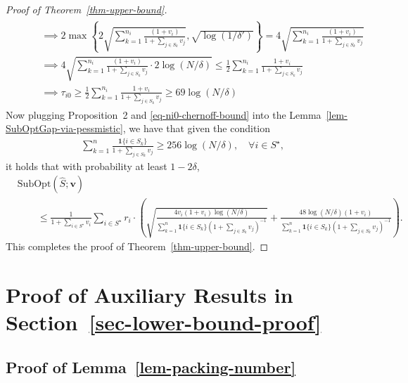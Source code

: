 \documentclass[10pt, letterpaper]{article}
\begin{document}
\begin{proof}[Proof of Theorem~\ref{thm-upper-bound}]
\begin{align}
\begin{aligned}
    &\qquad \implies 2 \max\left\{2\sqrt{\sum_{k = 1}^{n_i}\frac{(1+v_i)}{1+\sum_{j\in S_k} v_j}} ,\sqrt{\log(1/\delta')}\right\} = 4\sqrt{\sum_{k = 1}^{n_i}\frac{(1+v_i)}{1+\sum_{j\in S_k} v_j}}\\
    &\qquad\implies 4\sqrt{\sum_{k = 1}^{n_i}\frac{(1+v_i)}{1+\sum_{j\in S_k} v_j} \cdot 2\log (N/\delta)}\leq \frac{1}{2} \sum_{k = 1}^{n_i} \frac{1+v_i}{1+\sum_{j\in S_k} v_j} \\
    &\qquad\implies \tau_{i0} \geq \frac{1}{2}\sum_{k = 1}^{n_i} \frac{1+v_i}{1+\sum_{j\in S_k} v_j} \geq 69 \log(N/\delta)
    \end{aligned}
\end{align}
Now plugging Proposition~2 and \eqref{eq-ni0-chernoff-bound} into the Lemma~\ref{lem-SubOptGap-via-pessmistic}, we have that given the condition \begin{align*}
\sum_{k =1}^n \frac{\bm{1}\{i\in S_k\}}{1+\sum_{j\in S_k }v_j} \geq 256\log(N/\delta),\quad \forall i\in S^\star,
\end{align*}
it holds that with probability at least $1-2\delta$, 
\begin{align*}
        &\mathrm{SubOpt}( \widehat{S}; \bm{v}) \\
        &\qquad \le \frac{1}{1+\sum_{i\in S^\star} v_i}  \sum_{i\in S^\star} r_i\cdot \left(\sqrt{\frac{4v_i(1+v_i)\log (N/\delta) }{\sum_{k = 1}^n \bm{1}\{i\in S_k\}(1+\sum_{j\in S_k}v_j)^{-1}}}  + \frac{48\log(N/\delta) (1+v_i)}{\sum_{k = 1}^n \bm{1}\{i\in S_k\}(1+\sum_{j\in S_k}v_j)^{-1}} \right).
\end{align*}
This completes the proof of Theorem~\ref{thm-upper-bound}.
\end{proof}




\section{Proof of Auxiliary Results in Section~\ref{sec-lower-bound-proof}}\label{sec: proof lemma lower bound}

\subsection{Proof of Lemma~\ref{lem-packing-number}}
\end{document}
